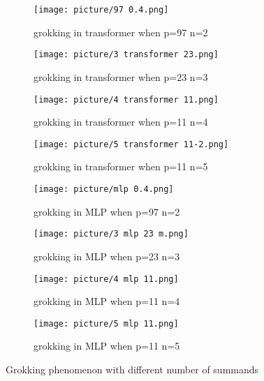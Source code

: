 \documentclass{article}
\begin{document}
\begin{figure}[htbp]
  \centering
   \begin{subfigure}[b]{0.22\textwidth}
        \centering
    \texttt{[image: picture/97 0.4.png]}
    \caption{grokking in transformer when p=97 n=2}
    \label{fig6:sub1}
  \end{subfigure}
  \hspace{0.5em} %
     \begin{subfigure}[b]{0.22\textwidth}
        \centering
    \texttt{[image: picture/3 transformer 23.png]}
    \caption{grokking in transformer when p=23 n=3}
    \label{fig6:sub2}
  \end{subfigure}
  \hspace{0.5em} %
     \begin{subfigure}[b]{0.22\textwidth}
        \centering
    \texttt{[image: picture/4 transformer 11.png]}
    \caption{grokking in transformer when p=11 n=4}
    \label{fig6:sub3}
  \end{subfigure}
  \hspace{0.5em} %
    \begin{subfigure}[b]{0.22\textwidth}
        \centering
    \texttt{[image: picture/5 transformer 11-2.png]}
    \caption{grokking in transformer when p=11 n=5}
    \label{fig6:sub4}
  \end{subfigure}
  
   \begin{subfigure}[b]{0.22\textwidth}
        \centering
    \texttt{[image: picture/mlp 0.4.png]}
    \caption{grokking in MLP when p=97 n=2}
    \label{fig6:sub5}
  \end{subfigure}
  \hspace{0.5em} %
     \begin{subfigure}[b]{0.22\textwidth}
        \centering
    \texttt{[image: picture/3 mlp 23 m.png]}
    \caption{grokking in MLP when p=23 n=3}
    \label{fig6:sub6}
  \end{subfigure}
  \hspace{0.5em} %
     \begin{subfigure}[b]{0.22\textwidth}
        \centering
    \texttt{[image: picture/4 mlp 11.png]}
    \caption{grokking in MLP when p=11 n=4}
    \label{fig6:sub7}
  \end{subfigure}
  \hspace{0.5em} %
    \begin{subfigure}[b]{0.22\textwidth}
        \centering
    \texttt{[image: picture/5 mlp 11.png]}
    \caption{grokking in MLP when p=11 n=5}
    \label{fig6:sub8}
  \end{subfigure}
  
  \renewcommand{\figurename}{Figure}
  \caption{Grokking phenomenon with different number of summands}
  \label{fig6:main}
  \vspace{-2em}
\end{figure}
\end{document}
